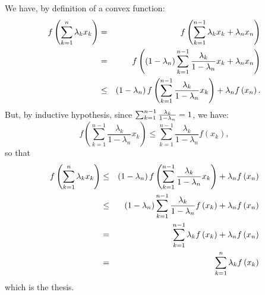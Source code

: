 \documentclass[12pt]{article}
\begin{document}
We have, by definition of a convex function:
\begin{eqnarray*}
f\left( \sum_{k=1}^{n}\lambda _{k}x_{k}\right)  &=&f\left(
\sum_{k=1}^{n-1}\lambda _{k}x_{k}+\lambda _{n}x_{n}\right)  \\
&=&f\left( \left( 1-\lambda _{n}\right) \sum_{k=1}^{n-1}\frac{\lambda _{k}}{%
1-\lambda _{n}}x_{k}+\lambda _{n}x_{n}\right)  \\
&\leq &\left( 1-\lambda _{n}\right) f\left( \sum_{k=1}^{n-1}\frac{\lambda
_{k}}{1-\lambda _{n}}x_{k}\right) +\lambda _{n}f\left( x_{n}\right) .
\end{eqnarray*}
But, by inductive hypothesis, since $\sum_{k=1}^{n-1}\frac{\lambda _{k}}{%
1-\lambda _{n}}=1$, we have:
\[
f\left( \sum_{k=1}^{n-1}\frac{\lambda _{k}}{1-\lambda _{n}}x_{k}\right) \leq
\sum_{k=1}^{n-1}\frac{\lambda _{k}}{1-\lambda _{n}}f\left( x_{k}\right) ,
\]
so that%
\begin{eqnarray*}
f\left( \sum_{k=1}^{n}\lambda _{k}x_{k}\right)  &\leq &\left( 1-\lambda
_{n}\right) f\left( \sum_{k=1}^{n-1}\frac{\lambda _{k}}{1-\lambda _{n}}%
x_{k}\right) +\lambda _{n}f\left( x_{n}\right)  \\
&\leq &\left( 1-\lambda _{n}\right) \sum_{k=1}^{n-1}\frac{\lambda _{k}}{%
1-\lambda _{n}}f\left( x_{k}\right) +\lambda _{n}f\left( x_{n}\right)  \\
&=&\sum_{k=1}^{n-1}\lambda _{k}f\left( x_{k}\right) +\lambda _{n}f\left(
x_{n}\right)  \\
&=&\sum_{k=1}^{n}\lambda _{k}f\left( x_{k}\right) 
\end{eqnarray*}
which is the thesis.
\end{document}
